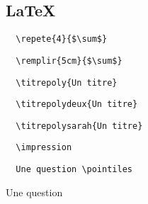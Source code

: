 \documentclass{article}
\begin{document}
\begin{multicols}{3}
  \section{\LaTeX}

\begin{Verbatim}
  \repete{4}{$\sum$}
\end{Verbatim}
\begin{minipage}{\linewidth}
\end{minipage}

\medskip
\begin{Verbatim}
  \remplir{5cm}{$\sum$}
\end{Verbatim}
\begin{minipage}{\linewidth}
  \remplir{5cm}{$\sum$}
\end{minipage}

\medskip
\begin{Verbatim}
  \titrepoly{Un titre}
\end{Verbatim}
\begin{minipage}{\linewidth}
\end{minipage}

\medskip
\begin{Verbatim}
  \titrepolydeux{Un titre}
\end{Verbatim}
\begin{minipage}{\linewidth}
\end{minipage}

\medskip
\begin{Verbatim}
  \titrepolysarah{Un titre}
\end{Verbatim}
\begin{minipage}{\linewidth}
\end{minipage}

\medskip
\begin{Verbatim}
  \impression
\end{Verbatim}
\begin{minipage}{\linewidth}
  \impression
\end{minipage}

\medskip
\begin{Verbatim}
  Une question \pointiles
\end{Verbatim}
\begin{minipage}{\linewidth}
  Une question \pointiles
\end{minipage}


\end{multicols}
\end{document}
